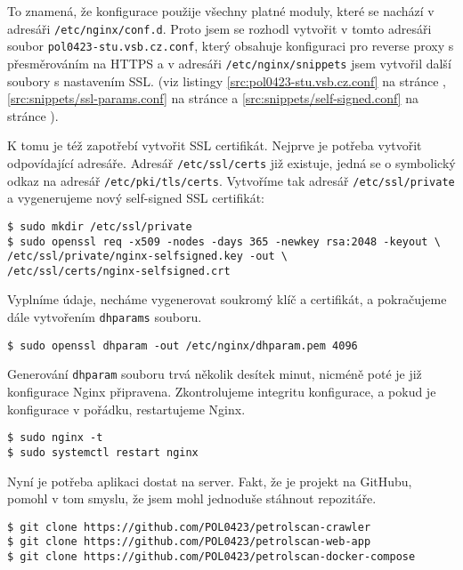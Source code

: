 To znamená, že konfigurace použije všechny platné moduly, které se nachází
v adresáři \texttt{/etc/nginx/conf.d}. Proto jsem se rozhodl vytvořit
v tomto adresáři soubor \texttt{pol0423-stu.vsb.cz.conf}, který obsahuje
konfiguraci pro reverse proxy s přesměrováním na HTTPS
a v adresáři \texttt{/etc/nginx/snippets} jsem vytvořil další
soubory s nastavením SSL. (viz listingy \ref{src:pol0423-stu.vsb.cz.conf}
na stránce \pageref{src:pol0423-stu.vsb.cz.conf},
\ref{src:snippets/ssl-params.conf} na stránce
\pageref{src:snippets/ssl-params.conf} a \ref{src:snippets/self-signed.conf}
na stránce \pageref{src:snippets/self-signed.conf}).

K tomu je též zapotřebí vytvořit SSL certifikát. Nejprve je potřeba vytvořit
odpovídající adresáře. Adresář \texttt{/etc/ssl/certs} již existuje, jedná
se o symbolický odkaz na adresář \texttt{/etc/pki/tls/certs}.
Vytvoříme tak adresář \texttt{/etc/ssl/private} a vygenerujeme nový
self-signed SSL certifikát:

\begin{verbatim}
$ sudo mkdir /etc/ssl/private
$ sudo openssl req -x509 -nodes -days 365 -newkey rsa:2048 -keyout \
/etc/ssl/private/nginx-selfsigned.key -out \
/etc/ssl/certs/nginx-selfsigned.crt
\end{verbatim}

Vyplníme údaje, necháme vygenerovat soukromý klíč a certifikát, a pokračujeme
dále vytvořením \texttt{dhparams} souboru.



\begin{verbatim}
$ sudo openssl dhparam -out /etc/nginx/dhparam.pem 4096
\end{verbatim}

Generování \texttt{dhparam} souboru trvá několik desítek minut, nicméně
poté je již konfigurace Nginx připravena. Zkontrolujeme integritu
konfigurace, a pokud je konfigurace v pořádku, restartujeme Nginx.

\begin{verbatim}
$ sudo nginx -t
$ sudo systemctl restart nginx
\end{verbatim}

Nyní je potřeba aplikaci dostat na server. Fakt, že je projekt na GitHubu,
pomohl v tom smyslu, že jsem mohl jednoduše stáhnout repozitáře.

\begin{verbatim}
$ git clone https://github.com/POL0423/petrolscan-crawler
$ git clone https://github.com/POL0423/petrolscan-web-app
$ git clone https://github.com/POL0423/petrolscan-docker-compose
\end{verbatim}

